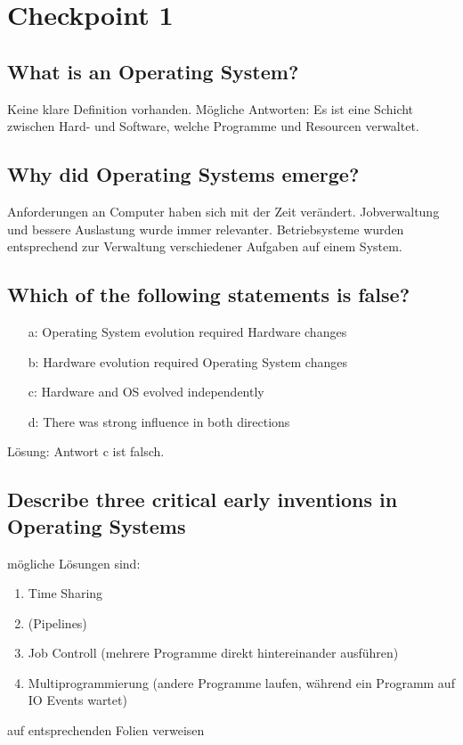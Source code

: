 \section{Checkpoint 1}

\addtocounter{subsection}{1}

\subsection{What is an Operating System?}
Keine klare Definition vorhanden.
Mögliche Antworten:
Es ist eine Schicht zwischen Hard- und Software, welche Programme und Resourcen verwaltet.

\subsection{Why did Operating Systems emerge?}
Anforderungen an Computer haben sich mit der Zeit verändert.
Jobverwaltung und bessere Auslastung wurde immer relevanter.
Betriebsysteme wurden entsprechend zur Verwaltung verschiedener Aufgaben auf einem System.

\subsection{Which of the following statements is false?}
\begin{enumerate}
    \item[a:] Operating System evolution required Hardware changes
    \item[b:] Hardware evolution required Operating System changes
    \item[c:] Hardware and OS evolved independently
    \item[d:] There was strong influence in both directions 
\end{enumerate}

Lösung: Antwort c ist falsch.

\subsection{Describe three critical early inventions in Operating Systems}
mögliche Lösungen sind:
\begin{enumerate}
    \item Time Sharing
    \item (Pipelines)
    \item Job Controll (mehrere Programme direkt hintereinander ausführen)
    \item Multiprogrammierung (andere Programme laufen, während ein Programm auf IO Events wartet)
\end{enumerate}
\todo auf entsprechenden Folien verweisen

